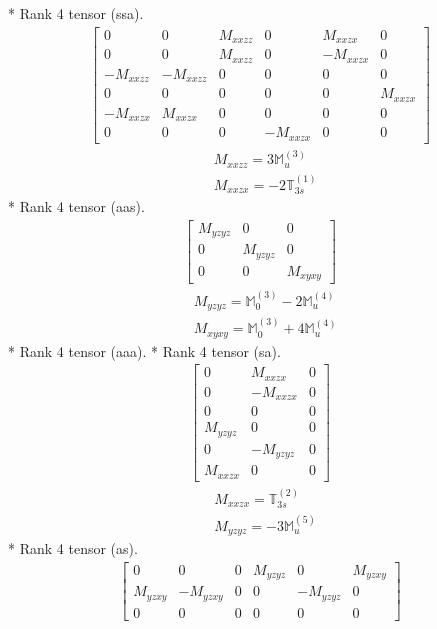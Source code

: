 \documentclass[fleqn,8pt,landscape]{jsarticle}
\begin{document}
* Rank 4 tensor (ssa).
\begin{align*}
\begin{bmatrix} 0 & 0 & M_{xxzz} & 0 & M_{xxzx} & 0 \\ 0 & 0 & M_{xxzz} & 0 & - M_{xxzx} & 0 \\ - M_{xxzz} & - M_{xxzz} & 0 & 0 & 0 & 0 \\ 0 & 0 & 0 & 0 & 0 & M_{xxzx} \\ - M_{xxzx} & M_{xxzx} & 0 & 0 & 0 & 0 \\ 0 & 0 & 0 & - M_{xxzx} & 0 & 0 \end{bmatrix}
\end{align*}
\begin{align*}
& M_{xxzz} = 3 \mathbb{M}_{u}^{(3)} \\
& M_{xxzx} = - 2 \mathbb{T}_{3s}^{(1)}
\end{align*}
* Rank 4 tensor (aas).
\begin{align*}
\begin{bmatrix} M_{yzyz} & 0 & 0 \\ 0 & M_{yzyz} & 0 \\ 0 & 0 & M_{xyxy} \end{bmatrix}
\end{align*}
\begin{align*}
& M_{yzyz} = \mathbb{M}_{0}^{(3)} - 2 \mathbb{M}_{u}^{(4)} \\
& M_{xyxy} = \mathbb{M}_{0}^{(3)} + 4 \mathbb{M}_{u}^{(4)}
\end{align*}
* Rank 4 tensor (aaa).
* Rank 4 tensor (sa).
\begin{align*}
\begin{bmatrix} 0 & M_{xxzx} & 0 \\ 0 & - M_{xxzx} & 0 \\ 0 & 0 & 0 \\ M_{yzyz} & 0 & 0 \\ 0 & - M_{yzyz} & 0 \\ M_{xxzx} & 0 & 0 \end{bmatrix}
\end{align*}
\begin{align*}
& M_{xxzx} = \mathbb{T}_{3s}^{(2)} \\
& M_{yzyz} = - 3 \mathbb{M}_{u}^{(5)}
\end{align*}
* Rank 4 tensor (as).
\begin{align*}
\begin{bmatrix} 0 & 0 & 0 & M_{yzyz} & 0 & M_{yzxy} \\ M_{yzxy} & - M_{yzxy} & 0 & 0 & - M_{yzyz} & 0 \\ 0 & 0 & 0 & 0 & 0 & 0 \end{bmatrix}
\end{align*}
\end{document}
